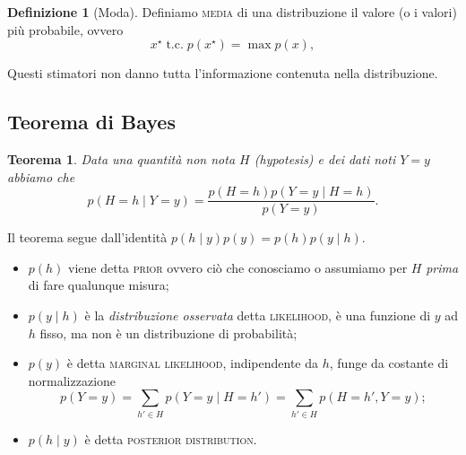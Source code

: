\documentclass[10pt]{article}
\newcommand{\im}[1]{\textsc{#1}}
\newcommand{\cond}{\mid}
\newcommand{\pare}[1]{
	\ensuremath{\left(#1\right)}
}
\newtheorem{theorem}{Teorema}[section]
\theoremstyle{definition}
\newtheorem{definition}{Definizione}[section]
\begin{document}
\begin{definition}[Moda]
Definiamo \im{media} di una distribuzione il valore (o i valori) più probabile, ovvero
\begin{equation}
x^\star \;\text{t.c.}\; p\pare{x^\star} = \max p\pare{x},
\end{equation}
\end{definition}

Questi stimatori non danno tutta l'informazione contenuta nella distribuzione.

\subsection{Teorema di Bayes}

\begin{theorem}
Data una quantità non nota $H$ (hypotesis) e dei dati noti $Y=y$ abbiamo che
\begin{equation}
p\pare{H=h\cond Y=y} = \frac{p\pare{H=h}p\pare{Y=y\cond H=h}}{p\pare{Y=y}}.
\end{equation}
\end{theorem}
Il teorema segue dall'identità $p\pare{h\cond y} p\pare{y} = p\pare{h} p\pare{y\cond h}$.
\begin{itemize}
\item $p\pare{h}$ viene detta \im{prior} ovvero ciò che conosciamo o assumiamo per $H$ \textit{prima} di fare qualunque misura;
\item $p\pare{y\cond h}$ è la \textit{distribuzione osservata} detta \im{likelihood}, è una funzione di $y$ ad $h$ fisso, ma non è un distribuzione di probabilità;
\item $p\pare{y}$ è detta \im{marginal likelihood}, indipendente da $h$, funge da costante di normalizzazione \[
p\pare{Y=y} = \sum_{h'\in H}p\pare{Y=y \cond H=h'} = \sum_{h'\in H}p\pare{H=h', Y=y};
\]
\item $p\pare{h\cond y}$ è detta \im{posterior distribution}.
\end{itemize}
\end{document}
